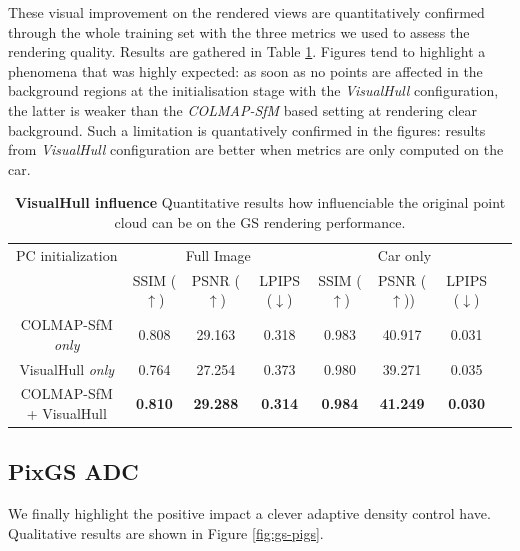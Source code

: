 These visual improvement on the rendered views are quantitatively confirmed through the whole training set with the three metrics we used to assess the rendering quality. Results are gathered in Table \ref{table:gs-vh-influence}. Figures tend to highlight a phenomena that was highly expected: as soon as no points are affected in the background regions at the initialisation stage with the \textit{VisualHull} configuration, the latter is weaker than the \textit{COLMAP-SfM} based setting at rendering clear background. Such a limitation is quantatively confirmed in the figures: results from \textit{VisualHull} configuration are better when metrics are only computed on the car. 
\begin{table}[htp!]
  \caption{\textbf{VisualHull influence} Quantitative results how influenciable the original point cloud can be on the GS rendering performance.}
  \label{table:gs-vh-influence}
  \begin{adjustbox}{width=\linewidth}
  \begin{tabular}[h]{c||ccccccc}
  \hline
   PC initialization & \multicolumn{3}{c}{Full Image} & \multicolumn{3}{c}{Car only} \\
   &  SSIM ($\uparrow$) & PSNR ($\uparrow$) & LPIPS ($\downarrow$) & SSIM ($\uparrow$) & PSNR ($\uparrow$)) & LPIPS ($\downarrow$)\\
  \hline
  COLMAP-SfM \textit{only} & 0.808 & 29.163 & 0.318 & 0.983 & 40.917 & 0.031\\
  VisualHull \textit{only} & 0.764 & 27.254 & 0.373 & 0.980 &   39.271 & 0.035 \\
  COLMAP-SfM + VisualHull & \textbf{0.810} & \textbf{29.288} & \textbf{0.314}  & \textbf{0.984} & \textbf{41.249}   & \textbf{0.030} \\
  \hline 
  \end{tabular}
  \end{adjustbox}
  \end{table}


\subsection{PixGS ADC} 

We finally highlight the  positive impact a clever adaptive density control have. Qualitative results are shown in Figure \ref{fig:gs-pigs}. 


